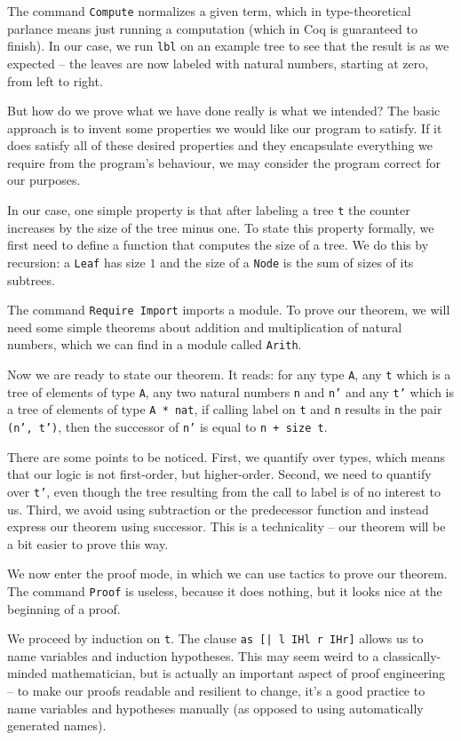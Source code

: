 \documentclass[declaration,inz,english,shortabstract]{iithesis}
\newcommand{\m}[1]{\texttt{#1}}
\begin{document}
The command \m{Compute} normalizes a given term, which in type-theoretical parlance means just running a computation (which in Coq is guaranteed to finish). In our case, we run \m{lbl} on an example tree to see that the result is as we expected -- the leaves are now labeled with natural numbers, starting at zero, from left to right.

But how do we prove what we have done really is what we intended? The basic approach is to invent some properties we would like our program to satisfy. If it does satisfy all of these desired properties and they encapsulate everything we require from the program's behaviour, we may consider the program correct for our purposes.

In our case, one simple property is that after labeling a tree \m{t} the counter increases by the size of the tree minus one. To state this property formally, we first need to define a function that computes the size of a tree. We do this by recursion: a \m{Leaf} has size $1$ and the size of a \m{Node} is the sum of sizes of its subtrees.

The command \m{Require Import} imports a module. To prove our theorem, we will need some simple theorems about addition and multiplication of natural numbers, which we can find in a module called \m{Arith}.

Now we are ready to state our theorem. It reads: for any type \m{A}, any \m{t} which is a tree of elements of type \m{A}, any two natural numbers \m{n} and \m{n'} and any \m{t'} which is a tree of elements of type \m{A * nat}, if calling label on \m{t} and \m{n} results in the pair \m{(n', t')}, then the successor of \m{n'} is equal to \m{n + size\ t}.

There are some points to be noticed. First, we quantify over types, which means that our logic is not first-order, but higher-order. Second, we need to quantify over \m{t'}, even though the tree resulting from the call to label is of no interest to us. Third, we avoid using subtraction or the predecessor function and instead express our theorem using successor. This is a technicality -- our theorem will be a bit easier to prove this way.

We now enter the proof mode, in which we can use tactics to prove our theorem. The command \m{Proof} is useless, because it does nothing, but it looks nice at the beginning of a proof.

We proceed by induction on \m{t}. The clause \m{as [| l IHl r IHr]} allows us to name variables and induction hypotheses. This may seem weird to a classically-minded mathematician, but is actually an important aspect of proof engineering -- to make our proofs readable and resilient to change, it's a good practice to name variables and hypotheses manually (as opposed to using automatically generated names).
\end{document}
